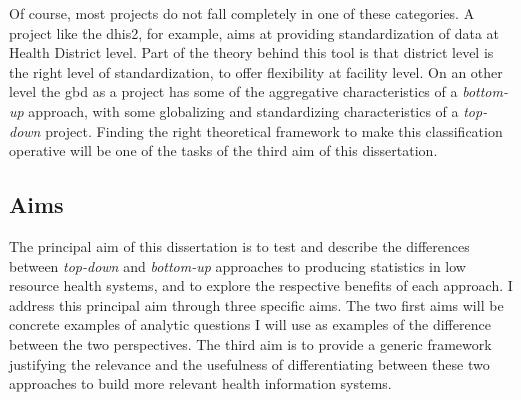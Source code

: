 Of course, most projects do not fall completely in one of these categories. A project like the \gls{dhis2}, for example, aims at providing standardization of data at Health District level. Part of the theory behind this tool is that district level is the right level of standardization, to offer flexibility at facility level. On an other level the \gls{gbd} as a project has some of the aggregative characteristics of a \textit{bottom-up} approach, with some globalizing and standardizing characteristics of a \textit{top-down} project. Finding the right theoretical framework to make this classification operative will be one of the tasks of the third aim of this dissertation.



\subsection{Aims}

The principal aim of this dissertation is to test and describe the differences between \textit{top-down} and \textit{bottom-up} approaches to producing statistics in low resource health systems, and to explore the respective benefits of each approach. I address this principal aim through three specific aims. The two first aims will be concrete examples of analytic questions I will use as examples of the difference between the two perspectives. The third aim is to provide a generic framework justifying the relevance and the usefulness of differentiating between these two approaches to build more relevant health information systems.


